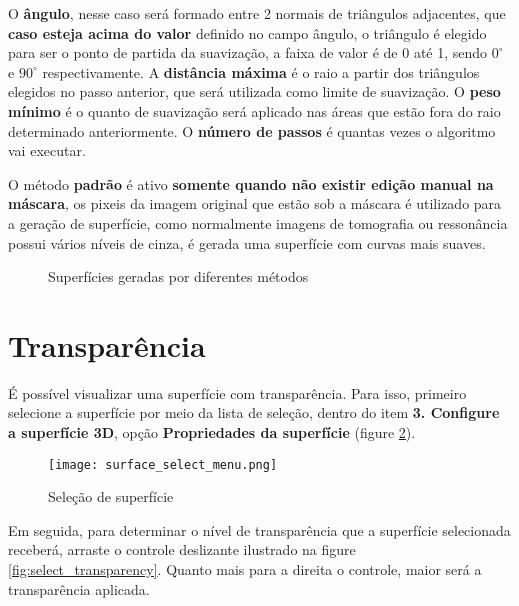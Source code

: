 O \textbf{ângulo}, nesse caso será formado entre 2 normais de triângulos adjacentes, que \textbf{caso esteja acima do valor} definido no campo ângulo, o triângulo é elegido para ser o ponto de partida da suavização, a faixa de valor é de 0 até 1, sendo $0^\circ$ e $90^\circ$ respectivamente. A \textbf{distância máxima} é o raio a partir dos triângulos elegidos no passo anterior, que será utilizada como limite de suavização. O \textbf{peso mínimo} é o quanto de suavização será aplicado nas áreas que estão fora do raio determinado anteriormente. O \textbf{número de passos} é quantas vezes o algoritmo vai executar.

O método \textbf{padrão} é ativo \textbf{somente quando não existir edição manual na máscara}, os pixeis da imagem original que estão sob a máscara é utilizado para a geração de superfície, como normalmente imagens de tomografia ou ressonância possui vários níveis de cinza, é gerada uma superfície com curvas mais suaves.

\begin{figure}[!htb]
  \centering
  \hfill
  \hfill
  \caption{Superfícies geradas por diferentes métodos }
  \label{fig:surf_method}
\end{figure}



\section{Transparência}

É possível visualizar uma superfície com transparência. Para isso, primeiro selecione a
superfície por meio da lista de seleção, dentro do item \textbf{3. Configure a superfície 3D}, opção
\textbf{Propriedades da superfície} (figure \ref{fig:select_surface}).

\begin{figure}[!htb]
\centering
\texttt{[image: surface\_select\_menu.png]}
\caption{Seleção de superfície}
\label{fig:select_surface}
\end{figure}

Em seguida, para determinar o nível de transparência que a superfície selecionada receberá, arraste
o controle deslizante ilustrado na figure \ref{fig:select_transparency}. Quanto mais para a direita
o controle, maior será a transparência aplicada.

